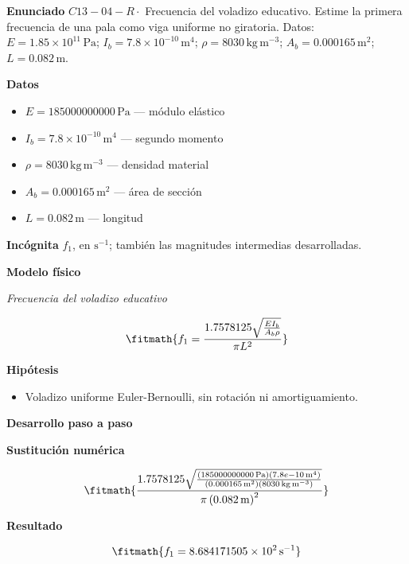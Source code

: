 \documentclass[10pt,openany]{book}
\begin{document}
\begin{tcolorbox}[title={Problema resuelto 4}, studiumworked, breakable]

\noindent\textbf{Enunciado}
\(C13-04-R \cdot\) Frecuencia del voladizo educativo. Estime la primera frecuencia de una pala como viga uniforme no giratoria. Datos: \(E=1.85\times 10^{11}\, \mathrm{Pa}\); \(I_b=7.8\times 10^{-10}\, \mathrm{m}^{4}\); \(\rho=8030\, \mathrm{kg}\,\mathrm{m}^{-3}\); \(A_b=0.000165\, \mathrm{m}^{2}\); \(L=0.082\, \mathrm{m}\).

\noindent\textbf{Datos}
\begin{itemize}
\item $E = 185000000000\,\mathrm{Pa}$ — módulo elástico
\item $I_b = 7.8\times 10^{-10}\,\mathrm{m}^{4}$ — segundo momento
\item $\rho = 8030\,\mathrm{kg}\,\mathrm{m}^{-3}$ — densidad material
\item $A_b = 0.000165\,\mathrm{m}^{2}$ — área de sección
\item $L = 0.082\,\mathrm{m}$ — longitud
\end{itemize}

\noindent\textbf{Incógnita}
$f_1$, en $\mathrm{s^{-1}}$; también las magnitudes intermedias desarrolladas.

\noindent\textbf{Modelo físico}

\noindent\textit{Frecuencia del voladizo educativo}

\[
\fitmath{f_1=\frac{1.7578125 \sqrt{\frac{E I_b}{A_b \rho}}}{\pi L^{2}}}
\]

\noindent\textbf{Hipótesis}
\begin{itemize}
\item Voladizo uniforme Euler-Bernoulli, sin rotación ni amortiguamiento.
\end{itemize}

\noindent\textbf{Desarrollo paso a paso}



\noindent\textbf{Sustitución numérica}

\[
\fitmath{\frac{1.7578125 \sqrt{\frac{\left(185000000000\,\mathrm{Pa}\right) \left(7.8e-10\,\mathrm{m}^{4}\right)}{\left(0.000165\,\mathrm{m}^{2}\right) \left(8030\,\mathrm{kg}\,\mathrm{m}^{-3}\right)}}}{\pi \left(0.082\,\mathrm{m}\right)^{2}}}
\]

\noindent\textbf{Resultado}

\[
\fitmath{f_1=8.684171505\times10^{2}\,\mathrm{s}^{-1}}
\]


\end{tcolorbox}
\end{document}
